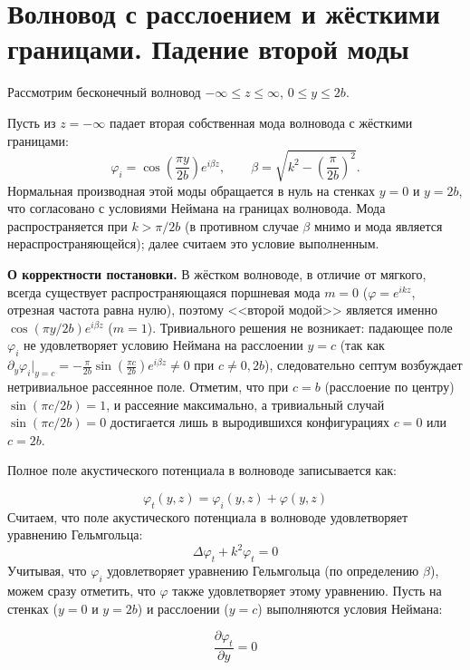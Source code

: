 \documentclass[a4paper,12pt]{article}
\begin{document}
\section*{Волновод с расслоением и жёсткими границами. Падение второй моды}

Рассмотрим бесконечный волновод $-\infty \leq z \leq \infty$, $0 \leq y \leq 2b$.

Пусть из $z = - \infty$ падает вторая собственная мода волновода с жёсткими границами:
\begin{equation}
\varphi_{i} = \cos\!\left(\dfrac{\pi y}{2b}\right) e^{i\beta z},
\qquad
\beta = \sqrt{k^2 - \left(\dfrac{\pi}{2b}\right)^2}.
\end{equation}
Нормальная производная этой моды обращается в нуль на стенках $y = 0$ и $y = 2b$, что согласовано с условиями Неймана на границах волновода. Мода распространяется при $k > \pi/2b$ (в противном случае $\beta$ мнимо и мода является нераспространяющейся); далее считаем это условие выполненным.

\medskip
\textbf{О корректности постановки.} В жёстком волноводе, в отличие от мягкого, всегда существует распространяющаяся поршневая мода $m=0$ ($\varphi = e^{ikz}$, отрезная частота равна нулю), поэтому <<второй модой>> является именно $\cos(\pi y/2b)e^{i\beta z}$ ($m=1$). Тривиального решения не возникает: падающее поле $\varphi_i$ не удовлетворяет условию Неймана на расслоении $y=c$ (так как $\partial_y \varphi_i |_{y=c} = -\frac{\pi}{2b}\sin\!\left(\frac{\pi c}{2b}\right) e^{i\beta z} \neq 0$ при $c \neq 0, 2b$), следовательно септум возбуждает нетривиальное рассеянное поле. Отметим, что при $c = b$ (расслоение по центру) $\sin(\pi c /2b) = 1$, и рассеяние максимально, а тривиальный случай $\sin(\pi c/2b) = 0$ достигается лишь в выродившихся конфигурациях $c=0$ или $c=2b$.

Полное поле акустического потенциала в волноводе записывается как:

$$ \varphi_t(y, z) = \varphi_i(y, z) + \varphi(y, z)$$
Считаем, что поле акустического потенциала в волноводе удовлетворяет уравнению Гельмгольца:
$$ \Delta \varphi_t + k^2 \varphi_t = 0 $$
Учитывая, что $\varphi_{i}$ удовлетворяет уравнению Гельмгольца (по определению $\beta$), можем сразу отметить, что $\varphi$ также удовлетворяет этому уравнению. Пусть на стенках ($y = 0$ и $y = 2b$) и расслоении ($y = c$) выполняются условия Неймана:

\begin{equation}
\dfrac{\partial \varphi_t}{\partial y}=0
\end{equation}
\end{document}

